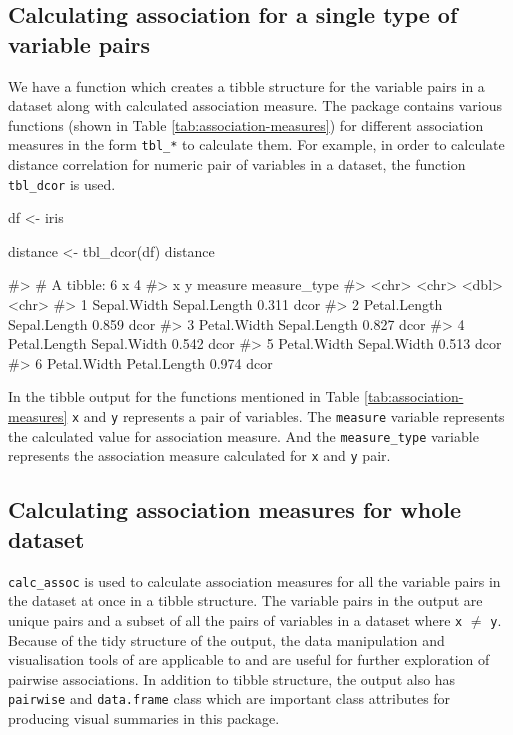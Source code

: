 \hypertarget{calculating-association-for-a-single-type-of-variable-pairs}{%
\subsection{Calculating association for a single type of variable
pairs}\label{calculating-association-for-a-single-type-of-variable-pairs}}

We have a function which creates a tibble structure for the variable
pairs in a dataset along with calculated association measure. The
package contains various functions (shown in Table
\ref{tab:association-measures}) for different association measures in
the form \texttt{tbl\_*} to calculate them. For example, in order to
calculate distance correlation for numeric pair of variables in a
dataset, the function \texttt{tbl\_dcor} is used.

\begin{Schunk}
\begin{Sinput}
df <- iris


distance <- tbl_dcor(df)
distance
\end{Sinput}
\begin{Soutput}
#> # A tibble: 6 x 4
#>   x            y            measure measure_type
#>   <chr>        <chr>          <dbl> <chr>       
#> 1 Sepal.Width  Sepal.Length   0.311 dcor        
#> 2 Petal.Length Sepal.Length   0.859 dcor        
#> 3 Petal.Width  Sepal.Length   0.827 dcor        
#> 4 Petal.Length Sepal.Width    0.542 dcor        
#> 5 Petal.Width  Sepal.Width    0.513 dcor        
#> 6 Petal.Width  Petal.Length   0.974 dcor
\end{Soutput}
\end{Schunk}

In the tibble output for the functions mentioned in Table
\ref{tab:association-measures} \texttt{x} and \texttt{y} represents a
pair of variables. The \texttt{measure} variable represents the
calculated value for association measure. And the \texttt{measure\_type}
variable represents the association measure calculated for \texttt{x}
and \texttt{y} pair.

\hypertarget{calculating-association-measures-for-whole-dataset}{%
\subsection{Calculating association measures for whole
dataset}\label{calculating-association-measures-for-whole-dataset}}

\texttt{calc\_assoc} is used to calculate association measures for all
the variable pairs in the dataset at once in a tibble structure. The
variable pairs in the output are unique pairs and a subset of all the
pairs of variables in a dataset where \texttt{x} \(\neq\) \texttt{y}.
Because of the tidy structure of the output, the data manipulation and
visualisation tools of  \citep{tidyverse} are
applicable to and are useful for further exploration of pairwise
associations. In addition to tibble structure, the output also has
\texttt{pairwise} and \texttt{data.frame} class which are important
class attributes for producing visual summaries in this package.

